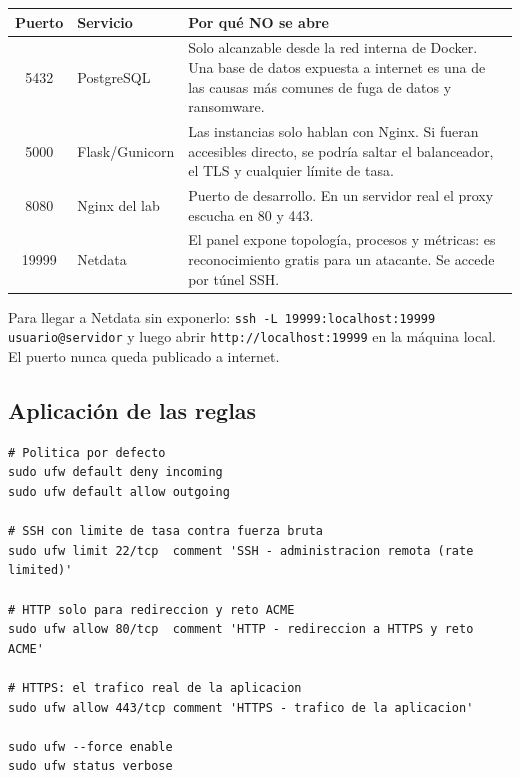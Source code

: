 \documentclass[11pt,letterpaper]{article}
\begin{document}
\begin{center}
\begin{tabular}{@{}c l p{9.6cm}@{}}
\toprule
\textbf{Puerto} & \textbf{Servicio} & \textbf{Por qué NO se abre} \\
\midrule
5432  & PostgreSQL      & Solo alcanzable desde la red interna de Docker. Una base de datos expuesta a internet es una de las causas más comunes de fuga de datos y ransomware. \\[4pt]
5000  & Flask/Gunicorn  & Las instancias solo hablan con Nginx. Si fueran accesibles directo, se podría saltar el balanceador, el TLS y cualquier límite de tasa. \\[4pt]
8080  & Nginx del lab   & Puerto de desarrollo. En un servidor real el proxy escucha en 80 y 443. \\[4pt]
19999 & Netdata         & El panel expone topología, procesos y métricas: es reconocimiento gratis para un atacante. Se accede por túnel SSH. \\
\bottomrule
\end{tabular}
\end{center}

\begin{nota}
Para llegar a Netdata sin exponerlo:
\texttt{ssh -L 19999:localhost:19999 usuario@servidor} y luego abrir
\texttt{http://localhost:19999} en la máquina local. El puerto nunca queda
publicado a internet.
\end{nota}

\subsection{Aplicación de las reglas}

\begin{lstlisting}[style=conf,caption={\texttt{lab-semana3/firewall/ufw\_reglas.sh} — extracto.}]
# Politica por defecto
sudo ufw default deny incoming
sudo ufw default allow outgoing

# SSH con limite de tasa contra fuerza bruta
sudo ufw limit 22/tcp  comment 'SSH - administracion remota (rate limited)'

# HTTP solo para redireccion y reto ACME
sudo ufw allow 80/tcp  comment 'HTTP - redireccion a HTTPS y reto ACME'

# HTTPS: el trafico real de la aplicacion
sudo ufw allow 443/tcp comment 'HTTPS - trafico de la aplicacion'

sudo ufw --force enable
sudo ufw status verbose
\end{lstlisting}
\end{document}
